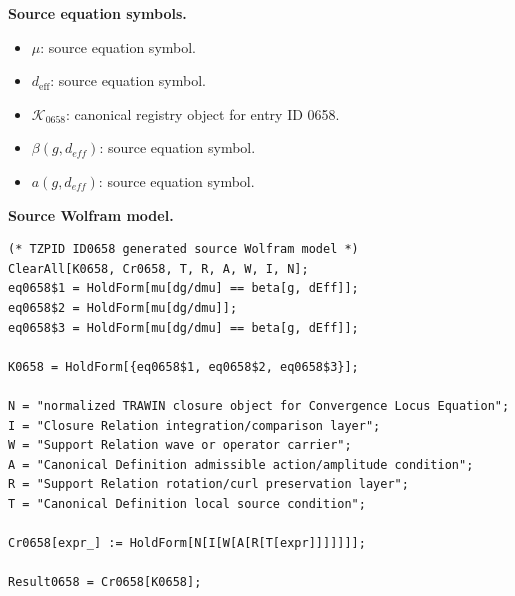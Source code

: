\begin{minipage}[t]{0.49\linewidth}
\begingroup
\small
\raggedright
\textbf{Source equation symbols.}\par
\begin{itemize}[leftmargin=1.35em,itemsep=1pt,topsep=1pt,parsep=0pt]
    \item $\mu$: source equation symbol.
    \item $d_{\mathrm{eff}}$: source equation symbol.
    \item $\mathcal{K}_{0658}$: canonical registry object for entry ID 0658.
    \item $\beta(g,d_{eff})$: source equation symbol.
    \item $a(g,d_{eff})$: source equation symbol.
\end{itemize}
\endgroup
\end{minipage}\hfill
\begin{minipage}[t]{0.47\linewidth}
\begingroup
\scriptsize
\raggedright
\textbf{Source Wolfram model.}\par
\begin{Verbatim}[fontsize=\tiny,breaklines=true,breakanywhere=true]
(* TZPID ID0658 generated source Wolfram model *)
ClearAll[K0658, Cr0658, T, R, A, W, I, N];
eq0658$1 = HoldForm[mu[dg/dmu] == beta[g, dEff]];
eq0658$2 = HoldForm[mu[dg/dmu]];
eq0658$3 = HoldForm[mu[dg/dmu] == beta[g, dEff]];

K0658 = HoldForm[{eq0658$1, eq0658$2, eq0658$3}];

N = "normalized TRAWIN closure object for Convergence Locus Equation";
I = "Closure Relation integration/comparison layer";
W = "Support Relation wave or operator carrier";
A = "Canonical Definition admissible action/amplitude condition";
R = "Support Relation rotation/curl preservation layer";
T = "Canonical Definition local source condition";

Cr0658[expr_] := HoldForm[N[I[W[A[R[T[expr]]]]]]];

Result0658 = Cr0658[K0658];
\end{Verbatim}
\endgroup
\end{minipage}

